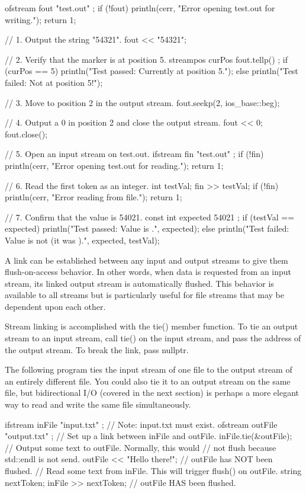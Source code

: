 \begin{cpp}
ofstream fout { "test.out" };
if (!fout) {
    println(cerr, "Error opening test.out for writing.");
    return 1;
}

// 1. Output the string "54321".
fout << "54321";

// 2. Verify that the marker is at position 5.
streampos curPos { fout.tellp() };
if (curPos == 5) {
    println("Test passed: Currently at position 5.");
} else {
    println("Test failed: Not at position 5!");
}

// 3. Move to position 2 in the output stream.
fout.seekp(2, ios_base::beg);

// 4. Output a 0 in position 2 and close the output stream.
fout << 0;
fout.close();

// 5. Open an input stream on test.out.
ifstream fin { "test.out" };
if (!fin) {
    println(cerr, "Error opening test.out for reading.");
    return 1;
}

// 6. Read the first token as an integer.
int testVal;
fin >> testVal;
if (!fin) {
    println(cerr, "Error reading from file.");
    return 1;
}

// 7. Confirm that the value is 54021.
const int expected { 54021 };
if (testVal == expected) {
    println("Test passed: Value is {}.", expected);
} else {
    println("Test failed: Value is not {} (it was {}).", expected, testVal);
}
\end{cpp}


A link can be established between any input and output streams to give them flush-on-access behavior. In other words, when data is requested from an input stream, its linked output stream is automatically flushed. This behavior is available to all streams but is particularly useful for file streams that may be dependent upon each other.

Stream linking is accomplished with the tie() member function. To tie an output stream to an input stream, call tie() on the input stream, and pass the address of the output stream. To break the link, pass nullptr.

The following program ties the input stream of one file to the output stream of an entirely different file. You could also tie it to an output stream on the same file, but bidirectional I/O (covered in the next section) is perhaps a more elegant way to read and write the same file simultaneously.

\begin{cpp}
ifstream inFile { "input.txt" }; // Note: input.txt must exist.
ofstream outFile { "output.txt" };
// Set up a link between inFile and outFile.
inFile.tie(&outFile);
// Output some text to outFile. Normally, this would
// not flush because std::endl is not send.
outFile << "Hello there!";
// outFile has NOT been flushed.
// Read some text from inFile. This will trigger flush() on outFile.
string nextToken;
inFile >> nextToken;
// outFile HAS been flushed.
\end{cpp}


